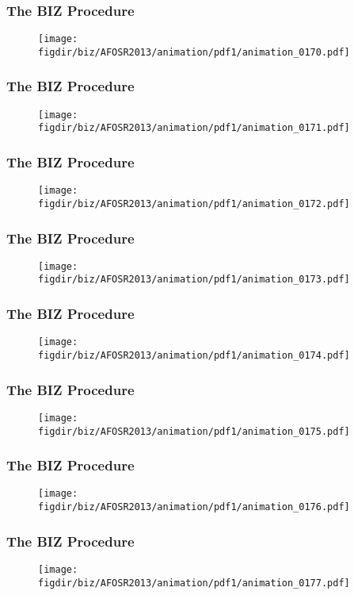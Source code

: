 \documentclass[13pt]{beamer}
\newcommand{\figdir}{../../fig}
\begin{document}
{\begin{frame}\frametitle{The BIZ Procedure}\begin{figure}\texttt{[image: \\figdir/biz/AFOSR2013/animation/pdf1/animation\_0170.pdf]}\end{figure}\end{frame}
\begin{frame}\frametitle{The BIZ Procedure}\begin{figure}\texttt{[image: \\figdir/biz/AFOSR2013/animation/pdf1/animation\_0171.pdf]}\end{figure}\end{frame}
\begin{frame}\frametitle{The BIZ Procedure}\begin{figure}\texttt{[image: \\figdir/biz/AFOSR2013/animation/pdf1/animation\_0172.pdf]}\end{figure}\end{frame}
\begin{frame}\frametitle{The BIZ Procedure}\begin{figure}\texttt{[image: \\figdir/biz/AFOSR2013/animation/pdf1/animation\_0173.pdf]}\end{figure}\end{frame}
\begin{frame}\frametitle{The BIZ Procedure}\begin{figure}\texttt{[image: \\figdir/biz/AFOSR2013/animation/pdf1/animation\_0174.pdf]}\end{figure}\end{frame}
\begin{frame}\frametitle{The BIZ Procedure}\begin{figure}\texttt{[image: \\figdir/biz/AFOSR2013/animation/pdf1/animation\_0175.pdf]}\end{figure}\end{frame}
\begin{frame}\frametitle{The BIZ Procedure}\begin{figure}\texttt{[image: \\figdir/biz/AFOSR2013/animation/pdf1/animation\_0176.pdf]}\end{figure}\end{frame}
\begin{frame}\frametitle{The BIZ Procedure}\begin{figure}\texttt{[image: \\figdir/biz/AFOSR2013/animation/pdf1/animation\_0177.pdf]}\end{figure}\end{frame}
}
\end{document}
